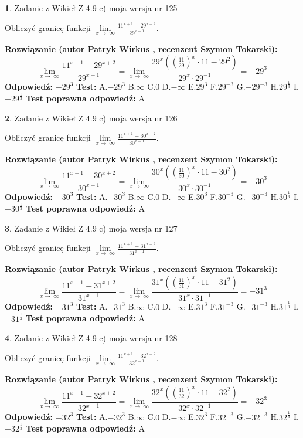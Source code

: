 \documentclass[12pt, a4paper]{article}
\theoremstyle{definition} %
\newtheorem{zad}{}
\newcommand{\zadStart}[1]{\begin{zad}#1\newline}
\newcommand{\zadStop}{\end{zad}}
\newcommand{\rozwStart}[2]{\noindent \textbf{Rozwiązanie (autor #1 , recenzent #2): }\newline}
\newcommand{\rozwStop}{\newline}
\newcommand{\odpStart}{\noindent \textbf{Odpowiedź:}\newline}
\newcommand{\odpStop}{\newline}
\newcommand{\testStart}{\noindent \textbf{Test:}\newline}
\newcommand{\testStop}{\newline}
\newcommand{\kluczStart}{\noindent \textbf{Test poprawna odpowiedź:}\newline}
\newcommand{\kluczStop}{\newline}
\begin{document}
\zadStart{Zadanie z Wikieł Z 4.9 c) moja wersja nr 125}


Obliczyć granicę funkcji  $\lim\limits_{x\to\ \infty}\frac{11^{x+1}-29^{x+2}}{29^{x-1}}$.
\zadStop
\rozwStart{Patryk Wirkus}{Szymon Tokarski}
$$\lim\limits_{x\to\ \infty}\frac{11^{x+1}-29^{x+2}}{29^{x-1}}=\lim\limits_{x\to\ \infty}\frac{29^{x}((\frac{11}{29})^{x}\cdot 11 -29^{2})}{29^{x}\cdot 29^{-1}} = -29^{3}$$
\rozwStop
\odpStart
$-29^{3}$
\odpStop
\testStart
A.$-29^{3}$ B.$\infty$ C.$0$ D.$-\infty$ E.$29^{3}$
F.$29^{-3}$ G.$-29^{-3}$
H.$29^{\frac{1}{3}}$
I.$-29^{\frac{1}{3}}$
\testStop
\kluczStart
A
\kluczStop



\zadStart{Zadanie z Wikieł Z 4.9 c) moja wersja nr 126}


Obliczyć granicę funkcji  $\lim\limits_{x\to\ \infty}\frac{11^{x+1}-30^{x+2}}{30^{x-1}}$.
\zadStop
\rozwStart{Patryk Wirkus}{Szymon Tokarski}
$$\lim\limits_{x\to\ \infty}\frac{11^{x+1}-30^{x+2}}{30^{x-1}}=\lim\limits_{x\to\ \infty}\frac{30^{x}((\frac{11}{30})^{x}\cdot 11 -30^{2})}{30^{x}\cdot 30^{-1}} = -30^{3}$$
\rozwStop
\odpStart
$-30^{3}$
\odpStop
\testStart
A.$-30^{3}$ B.$\infty$ C.$0$ D.$-\infty$ E.$30^{3}$
F.$30^{-3}$ G.$-30^{-3}$
H.$30^{\frac{1}{3}}$
I.$-30^{\frac{1}{3}}$
\testStop
\kluczStart
A
\kluczStop



\zadStart{Zadanie z Wikieł Z 4.9 c) moja wersja nr 127}


Obliczyć granicę funkcji  $\lim\limits_{x\to\ \infty}\frac{11^{x+1}-31^{x+2}}{31^{x-1}}$.
\zadStop
\rozwStart{Patryk Wirkus}{Szymon Tokarski}
$$\lim\limits_{x\to\ \infty}\frac{11^{x+1}-31^{x+2}}{31^{x-1}}=\lim\limits_{x\to\ \infty}\frac{31^{x}((\frac{11}{31})^{x}\cdot 11 -31^{2})}{31^{x}\cdot 31^{-1}} = -31^{3}$$
\rozwStop
\odpStart
$-31^{3}$
\odpStop
\testStart
A.$-31^{3}$ B.$\infty$ C.$0$ D.$-\infty$ E.$31^{3}$
F.$31^{-3}$ G.$-31^{-3}$
H.$31^{\frac{1}{3}}$
I.$-31^{\frac{1}{3}}$
\testStop
\kluczStart
A
\kluczStop



\zadStart{Zadanie z Wikieł Z 4.9 c) moja wersja nr 128}


Obliczyć granicę funkcji  $\lim\limits_{x\to\ \infty}\frac{11^{x+1}-32^{x+2}}{32^{x-1}}$.
\zadStop
\rozwStart{Patryk Wirkus}{Szymon Tokarski}
$$\lim\limits_{x\to\ \infty}\frac{11^{x+1}-32^{x+2}}{32^{x-1}}=\lim\limits_{x\to\ \infty}\frac{32^{x}((\frac{11}{32})^{x}\cdot 11 -32^{2})}{32^{x}\cdot 32^{-1}} = -32^{3}$$
\rozwStop
\odpStart
$-32^{3}$
\odpStop
\testStart
A.$-32^{3}$ B.$\infty$ C.$0$ D.$-\infty$ E.$32^{3}$
F.$32^{-3}$ G.$-32^{-3}$
H.$32^{\frac{1}{3}}$
I.$-32^{\frac{1}{3}}$
\testStop
\kluczStart
A
\kluczStop
\end{document}
